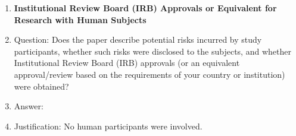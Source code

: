 \begin{enumerate}
\item {\bf Institutional Review Board (IRB) Approvals or Equivalent for Research with Human Subjects}
    \item[] Question: Does the paper describe potential risks incurred by study participants, whether such risks were disclosed to the subjects, and whether Institutional Review Board (IRB) approvals (or an equivalent approval/review based on the requirements of your country or institution) were obtained?
    \item[] Answer: \answerNA{}
    \item[] Justification: No human participants were involved.

\end{enumerate}
